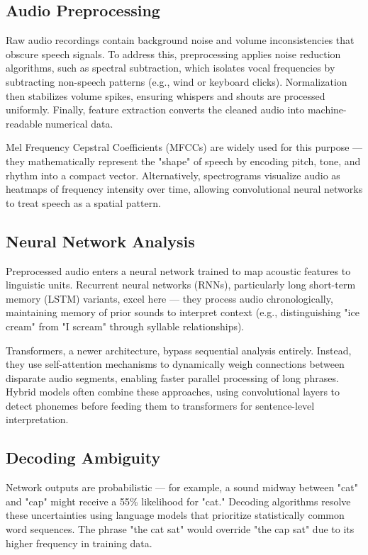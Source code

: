 \subsection{Audio Preprocessing}
Raw audio recordings contain background noise and volume inconsistencies that obscure speech signals.
To address this, preprocessing applies noise reduction algorithms, such as spectral subtraction,
which isolates vocal frequencies by subtracting non-speech patterns (e.g., wind or keyboard clicks).
Normalization then stabilizes volume spikes, ensuring whispers and shouts are processed uniformly.
Finally, feature extraction converts the cleaned audio into machine-readable numerical data.

Mel Frequency Cepstral Coefficients (MFCCs) are widely used for this purpose --- they mathematically represent
the "shape" of speech by encoding pitch, tone, and rhythm into a compact vector.
Alternatively, spectrograms visualize audio as heatmaps of frequency intensity over time,
allowing convolutional neural networks to treat speech as a spatial pattern.

\subsection{Neural Network Analysis}
Preprocessed audio enters a neural network trained to map acoustic features to linguistic units.
Recurrent neural networks (RNNs), particularly long short-term memory (LSTM) variants, excel here ---
they process audio chronologically, maintaining memory of prior sounds to interpret context
(e.g., distinguishing "ice cream" from "I scream" through syllable relationships).

Transformers, a newer architecture, bypass sequential analysis entirely.
Instead, they use self-attention mechanisms to dynamically weigh connections between
disparate audio segments, enabling faster parallel processing of long phrases.
Hybrid models often combine these approaches, using convolutional layers to detect phonemes
before feeding them to transformers for sentence-level interpretation.

\subsection{Decoding Ambiguity}
Network outputs are probabilistic --- for example, a sound midway between "cat" and "cap" might receive
a 55\% likelihood for "cat." Decoding algorithms resolve these uncertainties using language models
that prioritize statistically common word sequences. The phrase "the cat sat" would override
"the cap sat" due to its higher frequency in training data.


